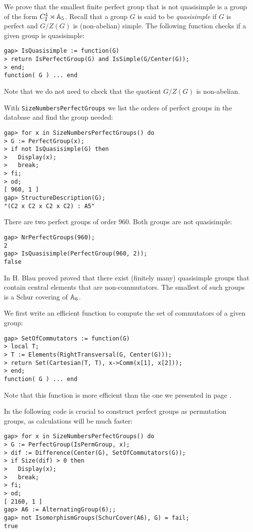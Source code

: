 \begin{example}
We prove that the smallest finite perfect
group that is not quasisimple 
is a group of the form $C_2^4\rtimes\mathbb{A}_5$. 
Recall that a group $G$ is said to be 
\emph{quasisimple} if $G$ is perfect and 
$G/Z(G)$ is (non-abelian) simple. The following function
checks if a given group is quasisimple:
\begin{lstlisting}
gap> IsQuasisimple := function(G)
> return IsPerfectGroup(G) and IsSimple(G/Center(G));
> end;
function( G ) ... end
\end{lstlisting}
Note that we do not need to check that
the quotient $G/Z(G)$ is non-abelian. 

With
\lstinline{SizeNumbersPerfectGroups} 
we list the orders of perfect groups in the database
and find the group needed:
\begin{lstlisting}
gap> for x in SizeNumbersPerfectGroups() do
> G := PerfectGroup(x);
> if not IsQuasisimple(G) then
>   Display(x);
>   break;
> fi;
> od;
[ 960, 1 ]
gap> StructureDescription(G);
"(C2 x C2 x C2 x C2) : A5"
\end{lstlisting}
There are two perfect groups of order 960. Both 
groups are not quasisimple:
\begin{lstlisting}
gap> NrPerfectGroups(960);
2
gap> IsQuasisimple(PerfectGroup(960, 2));
false
\end{lstlisting}
\end{example}

\begin{example}
\label{ex:Blaucommutators}
In \cite{MR1254833} H. Blau proved 
proved that there exist (finitely many) quasisimple 
groups that contain central elements that are non-commutators. The 
smallest of such groups is 
a Schur covering of $\mathbb{A}_6$.

We first write an efficient function to compute
the set of commutators of a given group:
\begin{lstlisting}
gap> SetOfCommutators := function(G)
> local T;
> T := Elements(RightTransversal(G, Center(G)));
> return Set(Cartesian(T, T), x->Comm(x[1], x[2]));
> end;
function( G ) ... end
\end{lstlisting}
Note that this function is more efficient than 
the one we presented in page \pageref{ex:commutatorElementsS16}. 

In the following
code is crucial to construct perfect groups
as permutation groups, as calculations will be much faster:
\begin{lstlisting}
gap> for x in SizeNumbersPerfectGroups() do
> G := PerfectGroup(IsPermGroup, x);
> dif := Difference(Center(G), SetOfCommutators(G));
> if Size(dif) > 0 then
>   Display(x);
>   break;
> fi;
> od;
[ 2160, 1 ]
gap> A6 := AlternatingGroup(6);;
gap> not IsomorphismGroups(SchurCover(A6), G) = fail;
true
\end{lstlisting}
\end{example}


